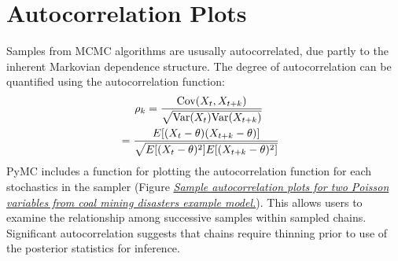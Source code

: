 \documentclass[letterpaper,10pt,english]{sphinxmanual}
\begin{document}
\section{Autocorrelation Plots}
\label{modelchecking:autocorrelation-plots}
Samples from MCMC algorithms are ususally autocorrelated, due partly to the inherent Markovian dependence structure. The degree of autocorrelation can be quantified using the autocorrelation function:
\begin{gather}
\begin{split}\rho_k & = \frac{\mbox{Cov}(X_t,  X_{t+k})}{\sqrt{\mbox{Var}(X_t)\mbox{Var}(X_{t+k})}}\end{split}\notag\\\begin{split}      & = \frac{E[(X_t - \theta)(X_{t+k} - \theta)]}{\sqrt{E[(X_t - \theta)^2] E[(X_{t+k} - \theta)^2]}}\end{split}\notag
\end{gather}
PyMC includes a function for plotting the autocorrelation function for each stochastics in the sampler (Figure {\hyperref[modelchecking:autocorr]{\emph{Sample autocorrelation plots for two Poisson variables from coal mining
disasters example model.}}}). This allows users to examine the relationship among successive samples within sampled chains. Significant autocorrelation suggests that chains require thinning prior to use of the posterior statistics for inference.
\end{document}
